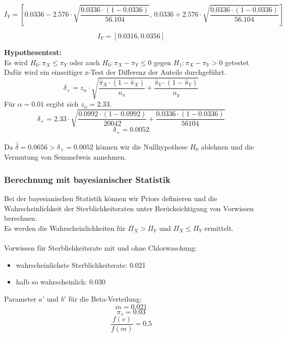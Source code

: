 \documentclass[a4paper,12pt]{article}
\begin{document}
\begin{equation}
  I_Y = \left[0.0336 - 2.576 \cdot \sqrt{\frac{0.0336 \cdot (1-0.0336)}{56.104}}, \, 
  0.0336 + 2.576 \cdot \sqrt{\frac{0.0336 \cdot (1-0.0336)}{56.104}}\right]
\end{equation}

\[
I_Y = [0.0316, 0.0356]
\]

\textbf{Hypothesentest:} \\
Es wird $H_0 : \pi_X \leq \pi_Y $ oder auch $H_0 : \pi_X - \pi_Y \leq 0$ gegen $H_1 : \pi_X - \pi_Y > 0$ getestet\\
Dafür wird ein einseitiger z-Test der Differenz der Anteile durchgeführt. \\
\begin{equation}
  \delta_+ = z_{\alpha} \cdot \sqrt{\frac{\hat{\pi}_X \cdot (1-\hat{\pi}_X)}{n_x} + \frac{\hat{\pi}_Y \cdot (1-\hat{\pi}_Y)}{n_y}}
\end{equation}
Für $\alpha = 0.01$ ergibt sich $z_{\alpha} = 2.33$.
\begin{equation}
  \delta_+ = 2.33 \cdot \sqrt{\frac{0.0992 \cdot (1-0.0992)}{20042} + \frac{0.0336 \cdot (1-0.0336)}{56104}}
\end{equation}
\begin{equation}
  \delta_+ = 0.0052
\end{equation}

Da $\hat{\delta} = 0.0656 > \delta_+ = 0.0052$ können wir die Nullhypothese $H_0$ ablehnen und die Vermutung von Semmelweis annehmen.


\subsubsection{Berechnung mit bayesianischer Statistik}
Bei der bayesianischen Statistik können wir Priors definieren und die Wahrscheinlichkeit der 
Sterblichkeitsraten unter Berücksichtigung von Vorwissen berechnen. \\
Es werden die Wahrscheinlichkeiten für $\Pi_X > \Pi_Y$ und $\Pi_X \leq \Pi_Y$ ermittelt. \\\\
Vorwissen für Sterblichkeitsrate mit und ohne Chlorwaschung:
\begin{itemize}
    \item wahrscheinlichste Sterblichkeitsrate: 0.021
    \item halb so wahrscheinlich: 0.030
\end{itemize}

Parameter $a'$ und $b'$ für die Beta-Verteilung:\\
\begin{equation}
  m = 0.021
\end{equation}
\begin{equation}
  \pi_v = 0.03
\end{equation}
\begin{equation}
  \frac{f(v)}{f(m)} = 0.5
\end{equation}
\end{document}
